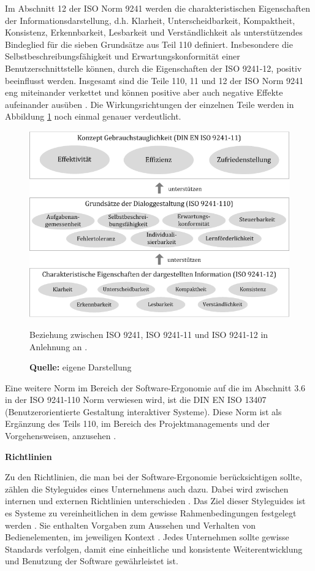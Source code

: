 Im Abschnitt 12 der ISO Norm 9241 werden die charakteristischen Eigenschaften der Informationsdarstellung, d.h. Klarheit, Unterscheidbarkeit, Kompaktheit, Konsistenz, Erkennbarkeit, Lesbarkeit und Verständlichkeit als unterstützendes Bindeglied für die sieben Grundsätze aus Teil 110 definiert. Insbesondere die Selbstbeschreibungsfähigkeit und Erwartungskonformität einer Benutzerschnittstelle können, durch die Eigenschaften der ISO 9241-12, positiv beeinflusst werden. Insgesamt sind die Teile 110, 11 und 12 der ISO Norm 9241 eng miteinander verkettet und können positive aber auch negative Effekte aufeinander ausüben \citep[vgl.][Kap. 6]{ISO9241-110}. Die Wirkungsrichtungen der einzelnen Teile werden in Abbildung \ref{fig:beziehungIsoNormen} noch einmal genauer verdeutlicht.
\begin{figure}[H]
  \centering
  \includegraphics[scale=0.85]{img/Beziehung_ISO9241_ISO9241-11_ISO9241-12.png}
  \caption{Beziehung zwischen ISO 9241, ISO 9241-11 und ISO 9241-12 in Anlehnung an \citep[]{ISO9241-110}.}
  \caption*{\textbf{Quelle:} eigene Darstellung}
  \label{fig:beziehungIsoNormen}
\end{figure}
Eine weitere Norm im Bereich der Software-Ergonomie auf die im Abschnitt 3.6 in der ISO 9241-110 Norm verwiesen wird, ist die DIN EN ISO 13407 (Benutzerorientierte Gestaltung interaktiver Systeme). Diese Norm ist als Ergänzung des Teils 110, im Bereich des Projektmanagements und der Vorgehensweisen, anzusehen \citep[vgl.][58]{Schneider2008}.

\textbf{Richtlinien}

Zu den Richtlinien, die man bei der Software-Ergonomie berücksichtigen sollte, zählen die Styleguides eines Unternehmens auch dazu. Dabei wird zwischen internen und externen Richtlinien unterschieden \citep[vgl.][74]{Richter2013}. Das Ziel dieser Styleguides ist es Systeme zu vereinheitlichen in dem gewisse Rahmenbedingungen festgelegt werden \citep[vgl.][]{Sarodnick2011}. Sie enthalten Vorgaben zum Aussehen und Verhalten von Bedienelementen, im jeweiligen Kontext \citep[vgl.][72]{Richter2013}. Jedes Unternehmen sollte gewisse Standards verfolgen, damit eine einheitliche und konsistente Weiterentwicklung und Benutzung der Software gewährleistet ist.


